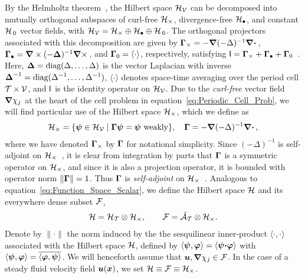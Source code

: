 \documentclass[amsa]{ipart}
\begin{document}
By the Helmholtz theorem~\cite{Denaro:2003:0271,Bhatia:IEE:1077}, the
Hilbert space $\mathcal{H}_{\mathcal{V}}$ can be decomposed into mutually orthogonal
subspaces of curl-free $\mathcal{H}_\times$, divergence-free $\mathcal{H}_\bullet$, and constant
$\mathcal{H}_{\,0}$ vector fields, with $\mathcal{H}_{\mathcal{V}}=\mathcal{H}_\times\oplus\mathcal{H}_\bullet\oplus\mathcal{H}_{\,0}$.  The orthogonal projectors associated with this decomposition are given by 
$\mbox{\boldmath${\Gamma}$}_\times=-\mbox{\boldmath${\nabla}$}(-\Delta)^{-1}\mbox{\boldmath${\nabla}$} \mbox{\boldmath${\cdot}$}\,$,
$\mbox{\boldmath${\Gamma}$}_\bullet=\mbox{\boldmath${\nabla}$}\times(-\mbox{\boldmath${\Delta}$})^{-1}\mbox{\boldmath${\nabla}$} \times\,$, and $\mbox{\boldmath${\Gamma}$}_0=\langle\cdot\rangle$, 
respectively, satisfying
$\mathsf{I}=\mbox{\boldmath${\Gamma}$}_\times+\mbox{\boldmath${\Gamma}$}_\bullet+\mbox{\boldmath${\Gamma}$}_0$~\cite{Fannjiang:1994:SIAM_JAM:333,MILTON:2002:TC}. Here, 
$\mbox{\boldmath${\Delta}$}=\text{diag}(\Delta,\ldots,\Delta)$ is the vector Laplacian with inverse
$\mbox{\boldmath${\Delta}$}^{-1}=\text{diag}(\Delta^{-1},\ldots,\Delta^{-1})$, $\langle\cdot\rangle$ denotes space-time
averaging over the period cell $\mathcal{T}\times\mathcal{V}$, and $\mathsf{I}$ is the identity
operator on $\mathcal{H}_{\mathcal{V}}$. Due to the \emph{curl-free} vector field
$\mbox{\boldmath${\nabla}$}\chi_j$ at the heart of the cell problem in
equation~\eqref{eq:Periodic_Cell_Prob}, we will find particular use of
the Hilbert space $\mathcal{H}_\times$, which we define as 
%
\begin{align}\label{eq:Hilbert_Curl_Free}
  \Hc_\times=\{\vecpsi\in\Hc_{\Vc} \; | \; \bGamma\vecpsi=\vecpsi \text{ weakly}\},
  \quad
  \bGamma=-\bnabla(-\Delta)^{-1}\bnabla \bcdot\,,
\end{align}
%
where we have denoted $\mbox{\boldmath${\Gamma}$}_\times$ by $\mbox{\boldmath${\Gamma}$}$ for notational
simplicity. Since $(-\Delta)^{-1}$ is self-adjoint on
$\mathcal{H}_\times$~\cite{Stakgold:BVP:2000}, it is clear from integration by parts
that $\mbox{\boldmath${\Gamma}$}$ is a symmetric operator on $\mathcal{H}_\times$, and since it is also
a projection operator, it is bounded with operator norm
$\|\mbox{\boldmath${\Gamma}$}\|=1$. Thus $\mbox{\boldmath${\Gamma}$}$ is \emph{self-adjoint} on
$\mathcal{H}_\times$~\cite{Stone:64,Reed-1980}.  Analogous to
equation~\eqref{eq:Function_Space_Scalar}, we define the Hilbert space
$\mathcal{H}$ and its everywhere dense subset $\mathcal{F}$,   
%
\begin{align}\label{eq:Function_Space_Vector} 
  \Hc=\Hc_{\Tc}\otimes\Hc_\times,  \qquad
  \Fc=\tilde{\Ac}_{\Tc}\otimes\Hc_\times.
\end{align}
%
Denote by $\|\cdot\|$ the norm induced by the the sesquilinear inner-product
$\langle\cdot,\cdot\rangle$ associated with the Hilbert space $\mathcal{H}$, 
defined by $\langle\boldsymbol{\psi},\boldsymbol{\varphi}\rangle=\left\langle\boldsymbol{\psi}\mbox{\boldmath${\cdot}$}\boldsymbol{\varphi}\right\rangle$
with $\langle\boldsymbol{\psi},\boldsymbol{\varphi}\rangle=\overline{\langle\boldsymbol{\varphi},\boldsymbol{\psi}\rangle}$. We will
henceforth assume that $\boldsymbol{u},\mbox{\boldmath${\nabla}$}\chi_j\in\mathcal{F}$. In the case of a steady fluid
velocity field $\boldsymbol{u}(\boldsymbol{x})$, we set $\mathcal{H}\equiv\mathcal{F}\equiv\mathcal{H}_\times$.
\end{document}
